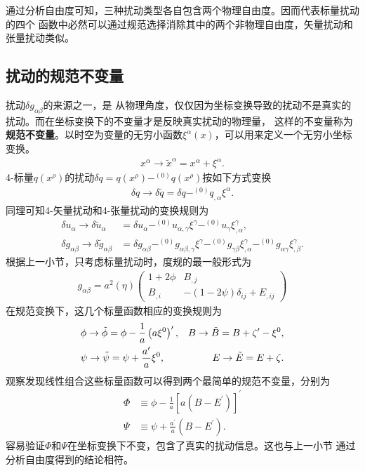 通过分析自由度可知，三种扰动类型各自包含两个物理自由度。因而代表标量扰动的四个
函数中必然可以通过规范选择消除其中的两个非物理自由度，矢量扰动和张量扰动类似。

\subsection{扰动的规范不变量}


扰动$\delta g_{\alpha\beta}$的来源之一，是
从物理角度，仅仅因为坐标变换导致的扰动不是真实的扰动。而在坐标变换下的不变量才是反映真实扰动的物理量，
这样的不变量称为\textbf{规范不变量}。以时空为变量的无穷小函数$\xi^{\alpha}(x)$，可以用来定义一个无穷小坐标变换。
\begin{align}
	\label{eq:coordinate-transformation}
	x^{\alpha} \rightarrow \tilde{x}^{\alpha}=x^{\alpha}+\xi^{\alpha}.
\end{align}
4-标量$q(x^{\rho})$的扰动$\delta
	q=q(x^{\rho})-^{(0)}q(x^{\rho})$按如下方式变换
\begin{align}
	\label{eq:scalar-perturbation-transformation}
	\delta q \rightarrow \delta\tilde{q}=\delta q
	-^{(0)}q_{,\alpha}\xi^{\alpha}.
\end{align}
同理可知4-矢量扰动和4-张量扰动的变换规则为
\begin{align}
	\label{eq:vector-perturbation-transformation}
	\delta u_{\alpha} \rightarrow \delta\tilde{u}_{\alpha}          & =
	\delta
	u_{\alpha}-^{(0)}u_{\alpha,\gamma}\xi^{\gamma}-^{(0)}u_{\gamma}\xi^{\gamma}_{,\alpha},
	\\
	\label{eq:tensor-perturbation-transformation}
	\delta g_{\alpha\beta}\rightarrow\delta \tilde{g}_{\alpha\beta} & =
	\delta g_{\alpha\beta}-^{(0)}g_{\alpha\beta,\gamma}\xi^{\gamma}
	-^{(0)}g_{\gamma\beta}\xi^{\gamma}_{,\alpha}-^{(0)}g_{\alpha\gamma}\xi^{\gamma}_{,\beta}.
\end{align}
根据上一小节，只考虑标量扰动时，度规的最一般形式为
\begin{align}
	\label{eq:scalar-metric-perturbation}
	g_{\alpha\beta}=a^2(\eta)
	\begin{pmatrix}
		1 + 2\phi & B_{,j}                        \\
		B_{,i}    & -(1-2\psi)\delta_{ij}+E_{,ij}
	\end{pmatrix}
\end{align}
在规范变换下，这几个标量函数相应的变换规则为
\begin{align}
  \label{eq:transformation-for-scalar-perturbation-functions}
  &\phi \rightarrow
  \tilde{\phi}=\phi-\frac{1}{a}\left(a\xi^{0}\right)^{\prime},
  & B \rightarrow \tilde{B}=B+\zeta^\prime-\xi^{0}, \\
  &\psi\rightarrow \tilde{\psi}=\psi + \frac{a^\prime}{a}\xi^{0},
  & E \rightarrow \tilde{E}=E+\zeta.
\end{align}
观察发现线性组合这些标量函数可以得到两个最简单的规范不变量，分别为
\begin{align}
	\label{eq:gauge-invariant-scalar}
	\Phi & \equiv \phi -\frac{1}{a}{[a{\left(B-E^{\prime}\right)}]}^{\prime} \\
	\Psi & \equiv \psi + \frac{a^{\prime}}{a}{\left(B-E^{\prime}\right)}.
\end{align}
容易验证$\Phi$和$\Psi$在坐标变换下不变，包含了真实的扰动信息。这也与上一小节
通过分析自由度得到的结论相符。

